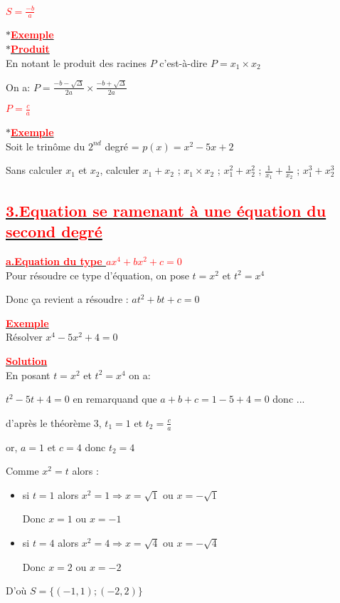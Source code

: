 \documentclass[12pt]{article}
\begin{document}
	\textbf{\textcolor{red}{$S=\frac{-b}{a}$}}
	
$\ast$\underline{\textbf{\textcolor{red}{Exemple}}}\\
$\ast$\underline{\textbf{\textcolor{red}{Produit}}}\\
En notant le produit des racines $P$ c'est-à-dire $P=x_{1}\times x_{2}$

On a: $P=\frac{-b-\sqrt{\Delta}}{2a}\times \frac{-b+\sqrt{\Delta}}{2a}$

	\textbf{\textcolor{red}{$P=\frac{c}{a}$}}
	
$\ast$\underline{\textbf{\textcolor{red}{Exemple}}}\\
Soit le trinôme du $2^{nd}$ degré = $p(x)=x^{2}-5x+2$

Sans calculer $x_{1}$ et $x_{2}$, calculer $x_{1}+x_{2}$ ; $x_{1}\times x_{2}$ ; 
$x_{1}^{2}+x_{2}^{2}$ ; $\frac{1}{x_{1}}+\frac{1}{x_{2}}$ ; $x_{1}^{3}+x_{2}^{3}$
\subsection*{\underline{\textbf{\textcolor{red}{3.Equation se ramenant à une équation du second degré}}}}
\underline{\textbf{\textcolor{red}{a.Equation du type $ax^{4}+bx^{2}+c=0$}}}\\
Pour résoudre ce type d'équation, on pose $t=x^{2}$ et $t^{2}=x^{4}$

Donc ça revient a résoudre : $at^{2}+bt+c=0$

\underline{\textbf{\textcolor{red}{Exemple}}}\\
Résolver $x^{4}-5x^{2}+4=0$

\underline{\textbf{\textcolor{red}{Solution}}}\\
En posant $t=x^{2}$ et $t^{2}=x^{4}$ on a:

$t^{2}-5t+4=0$ en remarquand que $a+b+c=1-5+4=0$ donc ...

d'après le théorème 3, $t_{1}=1$ et $t_{2}=\frac{c}{a}$

or, $a=1$ et $c=4$ donc $t_{2}=4$

Comme $x^{2}=t$ alors :
\begin{itemize}
\item si $t=1$ alors $x^{2}=1 \Rightarrow x=\sqrt{1}$ ou 
$x=-\sqrt{1}$

Donc $x=1$ ou $x=-1$
\item si $t=4$ alors $x^{2}=4 \Rightarrow x=\sqrt{4}$ ou 
$x=-\sqrt{4}$

Donc $x=2$ ou $x=-2$
\end{itemize}
D'où $S=\lbrace(-1, 1);(-2, 2) \rbrace$
\end{document}
